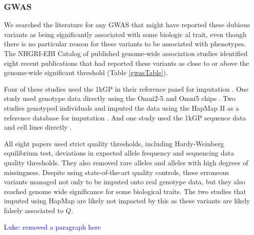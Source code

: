 \documentclass[9pt,lineno]{elife}
\newcommand{\luke}[1]{\textcolor{blue}{Luke: #1}}
\begin{document}
\subsubsection{GWAS}
We searched the literature for any GWAS that might have reported these dubious variants as being significantly associated with some biologic al trait, even though there is no particular reason for these variants to be associated with phenotypes.
The NHGRI-EBI Catalog of published genome-wide association studies identified eight recent publications that had reported these variants as close to or above the genome-wide significant threshold (Table \ref{gwasTable}).

Four of these studies used the 1kGP in their reference panel for imputation \citep{astle2016allelic, lopez2017genome, tian2017genome, luciano2018association}.
One study used genotype data directly using the Omni2-5 and Omni5 chips \citep{yucesoy2015genome}.
Two studies genotyped individuals and imputed the data using the HapMap II as a reference  database for imputation \citep{Kraja2011, Ebejer2013}.
And one study used the 1kGP sequence data and cell lines directly \citep{Mandage2017}.

All eight papers used strict quality thresholds, including Hardy-Weinberg equilibrium test, deviations in expected allele frequency and sequencing data quality thresholds.
They also removed rare alleles and alleles with high degrees of missingness.
Despite using state-of-the-art quality controls, these erroneous variants managed not only to be imputed onto real genotype data, but they also reached genome wide significance for some biological traits.
The two studies that imputed using HapMap are likely not impacted by this as these variants are likely falsely associated to $Q$.

\luke{removed a paragraph here}

\end{document}
